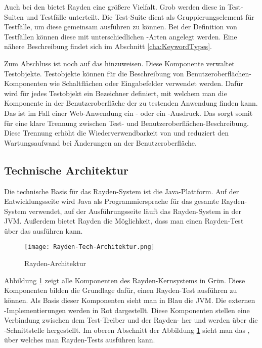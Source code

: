 \SuperPar
Auch bei den  bietet Rayden eine größere Vielfalt. Grob werden diese in Test-Suiten und Testfälle unterteilt. Die Test-Suite dient als Gruppierungselement für Testfälle, um diese gemeinsam ausführen zu können. Bei der Definition von Testfällen können diese mit unterschiedlichen -Arten angelegt werden. Eine nähere Beschreibung findet sich im Abschnitt \ref{cha:KeywordTypes}.

\SuperPar
Zum Abschluss ist noch auf das  hinzuweisen. Diese Komponente verwaltet Testobjekte. Testobjekte können für die Beschreibung von Benutzeroberflächen-Komponenten wie Schaltflächen oder Eingabefelder verwendet werden. Dafür wird für jedes Testobjekt ein Bezeichner definiert, mit welchem man die Komponente in der Benutzeroberfläche der zu testenden Anwendung finden kann. Das ist im Fall einer Web-Anwendung ein - oder ein -Ausdruck. Das  sorgt somit für eine klare Trennung zwischen Test- und Benutzeroberflächen-Beschreibung. Diese Trennung erhöht die Wiederverwendbarkeit von  und reduziert den Wartungsaufwand bei Änderungen an der Benutzeroberfläche.

\subsection{Technische Architektur}
\label{cha:TechArch}

Die technische Basis für das Rayden-System ist die Java-Plattform. Auf der Entwicklungsseite wird Java als Programmiersprache für das gesamte Rayden-System verwendet, auf der Ausführungsseite läuft das Rayden-System in der JVM. Außerdem bietet Rayden die Möglichkeit, dass man einen Rayden-Test über das  \cite{JavaScriptApi} ausführen kann. 

\begin{figure}[h]
\centering
\texttt{[image: Rayden-Tech-Architektur.png]}
\caption{Rayden-Architektur}
\label{fig:rayden-tech-arch}
\end{figure}

\SuperPar
Abbildung \ref{fig:rayden-tech-arch} zeigt alle Komponenten des Rayden-Kernsystems in Grün. Diese Komponenten bilden die Grundlage dafür, einen Rayden-Test ausführen zu können. Als Basis dieser Komponenten sieht man in Blau die JVM. Die externen -Implementierungen werden in Rot dargestellt. Diese Komponenten stellen eine Verbindung zwischen dem Test-Treiber und der Rayden- her und werden über die -Schnittstelle hergestellt. Im oberen Abschnitt der Abbildung \ref{fig:rayden-tech-arch} sieht man das , über welches man Rayden-Tests ausführen kann.

